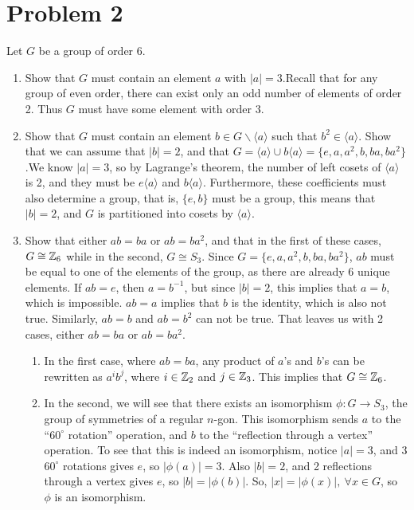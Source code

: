 \documentclass[a4paper,12pt]{extarticle}
\theoremstyle{definition}
\begin{document}
    \section*{Problem 2}
    Let $G$ be a group of order 6.
    \begin{enumerate}[label=(\alph*)]
        \item Show that $G$ must contain an element $a$ with $|a|=3$.\myskip Recall that for any group of even order, there can exist only an odd number of elements of order 2. Thus $G$ must have some element with order 3.
        \item Show that $G$ must contain an element $b\in G\backslash\langle a\rangle$ such that $b^2\in\langle a\rangle$. Show that we can assume that $|b|=2$, and that $G=\langle a\rangle\cup b\langle a\rangle=\{e,a,a^2,b,ba,ba^2\}$.\myskip We know $|a|=3$, so by Lagrange's theorem, the number of left cosets of $\langle a\rangle$ is 2, and they must be $e\langle a\rangle$ and $b\langle a\rangle$. Furthermore, these coefficients must also determine a group, that is, $\{e,b\}$ must be a group, this means that $|b|=2$, and $G$ is partitioned into cosets by $\langle a\rangle$.
        \item Show that either $ab=ba$ or $ab=ba^2$, and that in the first of these cases, $G\cong\mathbb{Z}_6$ while in the second, $G\cong S_3$. \myskip Since $G=\{e,a,a^2,b,ba,ba^2\}$, $ab$ must be equal to one of the elements of the group, as there are already 6 unique elements. If $ab=e$, then $a=b^{-1}$, but since $|b|=2$, this implies that $a=b$, which is impossible. $ab=a$ implies that $b$ is the identity, which is also not true. Similarly, $ab=b$ and $ab=b^2$ can not be true. That leaves us with 2 cases, either $ab=ba$ or $ab=ba^2$.\begin{enumerate}[label=\roman*.]
            \item In the first case, where $ab=ba$, any product of $a$'s and $b$'s can be rewritten as $a^ib^j$, where $i\in\mathbb{Z}_2$ and $j\in\mathbb{Z}_3$. This implies that $G\cong\mathbb{Z}_6$.
            \item In the second, we will see that there exists an isomorphism $\phi:G\to S_3$, the group of symmetries of a regular $n$-gon. This isomorphism sends $a$ to the ``$60^{\circ}$ rotation'' operation, and $b$ to the ``reflection through a vertex'' operation. To see that this is indeed an isomorphism, notice $|a|=3$, and 3 $60^{\circ}$ rotations gives $e$, so $|\phi(a)|=3$. Also $|b|=2$, and 2 reflections through a vertex gives $e$, so $|b|=|\phi(b)|$. So, $|x|=|\phi(x)|,\ \forall x\in G$, so $\phi$ is an isomorphism.
            \end{enumerate}
        \end{enumerate}
\end{document}
